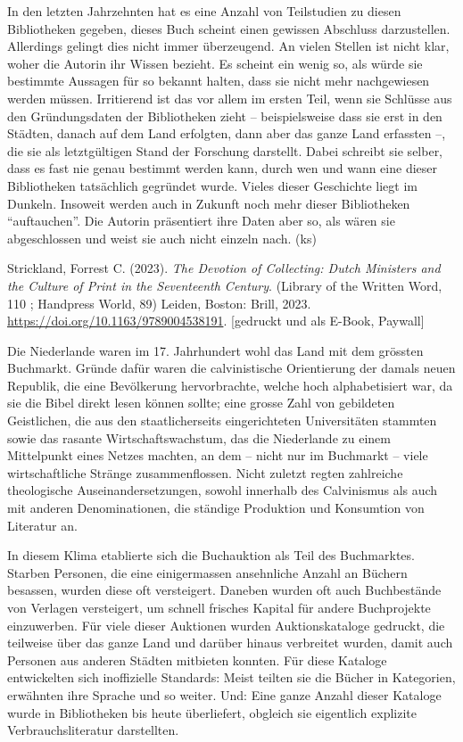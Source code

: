 \documentclass[a4paper,
fontsize=11pt,
oneside,
numbers=noperiodatend,
parskip=half-,
bibliography=totoc,
final
]{scrartcl}
\begin{document}
In den letzten Jahrzehnten hat es eine Anzahl von Teilstudien zu diesen
Bibliotheken gegeben, dieses Buch scheint einen gewissen Abschluss
darzustellen. Allerdings gelingt dies nicht immer überzeugend. An vielen
Stellen ist nicht klar, woher die Autorin ihr Wissen bezieht. Es scheint
ein wenig so, als würde sie bestimmte Aussagen für so bekannt halten,
dass sie nicht mehr nachgewiesen werden müssen. Irritierend ist das vor
allem im ersten Teil, wenn sie Schlüsse aus den Gründungsdaten der
Bibliotheken zieht -- beispielsweise dass sie erst in den Städten,
danach auf dem Land erfolgten, dann aber das ganze Land erfassten --,
die sie als letztgültigen Stand der Forschung darstellt. Dabei schreibt
sie selber, dass es fast nie genau bestimmt werden kann, durch wen und
wann eine dieser Bibliotheken tatsächlich gegründet wurde. Vieles dieser
Geschichte liegt im Dunkeln. Insoweit werden auch in Zukunft noch mehr
dieser Bibliotheken \enquote{auftauchen}. Die Autorin präsentiert ihre
Daten aber so, als wären sie abgeschlossen und weist sie auch nicht
einzeln nach. (ks)

Strickland, Forrest C. (2023). \emph{The Devotion of Collecting: Dutch
Ministers and the Culture of Print in the Seventeenth Century}. (Library
of the Written Word, 110 ; Handpress World, 89) Leiden, Boston: Brill,
2023. \url{https://doi.org/10.1163/9789004538191}. {[}gedruckt und als
E-Book, Paywall{]}

Die Niederlande waren im 17. Jahrhundert wohl das Land mit dem grössten
Buchmarkt. Gründe dafür waren die calvinistische Orientierung der damals
neuen Republik, die eine Bevölkerung hervorbrachte, welche hoch
alphabetisiert war, da sie die Bibel direkt lesen können sollte; eine
grosse Zahl von gebildeten Geistlichen, die aus den staatlicherseits
eingerichteten Universitäten stammten sowie das rasante
Wirtschaftswachstum, das die Niederlande zu einem Mittelpunkt eines
Netzes machten, an dem -- nicht nur im Buchmarkt -- viele
wirtschaftliche Stränge zusammenflossen. Nicht zuletzt regten zahlreiche
theologische Auseinandersetzungen, sowohl innerhalb des Calvinismus als
auch mit anderen Denominationen, die ständige Produktion und Konsumtion
von Literatur an.

In diesem Klima etablierte sich die Buchauktion als Teil des
Buchmarktes. Starben Personen, die eine einigermassen ansehnliche Anzahl
an Büchern besassen, wurden diese oft versteigert. Daneben wurden oft
auch Buchbestände von Verlagen versteigert, um schnell frisches Kapital
für andere Buchprojekte einzuwerben. Für viele dieser Auktionen wurden
Auktionskataloge gedruckt, die teilweise über das ganze Land und darüber
hinaus verbreitet wurden, damit auch Personen aus anderen Städten
mitbieten konnten. Für diese Kataloge entwickelten sich inoffizielle
Standards: Meist teilten sie die Bücher in Kategorien, erwähnten ihre
Sprache und so weiter. Und: Eine ganze Anzahl dieser Kataloge wurde in
Bibliotheken bis heute überliefert, obgleich sie eigentlich explizite
Verbrauchsliteratur darstellten.
\end{document}
